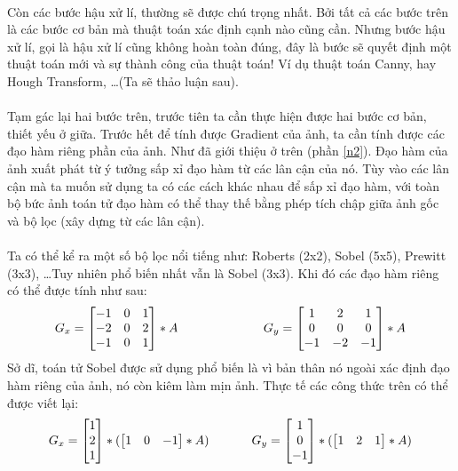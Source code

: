 \documentclass{article}
\begin{document}
 \phantom{a}\\
 Còn các bước hậu xử lí, thường sẽ được chú trọng nhất. Bởi tất cả các bước trên là các bước cơ bản mà thuật toán xác định cạnh nào cũng cần. Nhưng bước hậu xử lí, gọi là hậu xử lí cũng không hoàn toàn đúng, đây là bước sẽ quyết định một thuật toán mới và sự thành công của thuật toán! Ví dụ thuật toán Canny, hay Hough Transform, \ldots (Ta sẽ thảo luận sau).\\\\
 Tạm gác lại hai bước trên, trước tiên ta cần thực hiện được hai bước cơ bản, thiết yếu ở giữa. Trước hết để tính được Gradient của ảnh, ta cần tính được các đạo hàm riêng phần của ảnh. Như đã giới thiệu ở trên (phần \ref{n2}). Đạo hàm của ảnh xuất phát từ ý tưởng sấp xỉ đạo hàm từ các lân cận của nó. Tùy vào các lân cận mà ta muốn sử dụng ta có các cách khác nhau để sấp xỉ đạo hàm, với toàn bộ bức ảnh toán tử đạo hàm có thể thay thế bằng phép tích chập giữa ảnh gốc và bộ lọc (xây dựng từ các lân cận). \\\\Ta có thể kể ra một số bộ lọc nổi tiếng như: Roberts (2x2), Sobel (5x5), Prewitt (3x3), \ldots Tuy nhiên phổ biến nhất vẫn là Sobel (3x3). Khi đó các đạo hàm riêng có thể được tính như sau:
        $$
   G_x = \begin{bmatrix}
        -1 & 0 & 1\\
        -2  & 0 & 2\\
        -1 & 0 & 1
    \end{bmatrix}*A
    \hspace{0.2\textwidth}
    G_y = \begin{bmatrix}
    1 & 2 & 1\\
    0 & 0 & 0 \\
    -1 & -2 & -1
    \end{bmatrix}*A
    $$
    Sở dĩ, toán tử Sobel được sử dụng phổ biến là vì bản thân nó ngoài xác định đạo hàm riêng của ảnh, nó còn kiêm làm mịn ảnh. Thực tế các công thức trên có thể được viết lại:
    $$G_x = \begin{bmatrix}
        1\\2\\1
    \end{bmatrix}*(\begin{bmatrix}
        1&0&-1
    \end{bmatrix}*A)\hspace{0.1\textwidth}     G_y = \begin{bmatrix}
        1\\0\\-1
    \end{bmatrix}*(\begin{bmatrix}
        1&2&1
    \end{bmatrix}*A)$$
\end{document}
